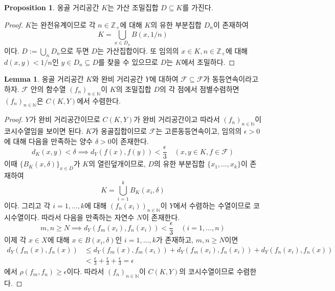 \documentclass[11pt]{book}
\numberwithin{equation}{chapter}
\def\NN{\mathbb{N}}
\def\ZZ{\mathbb{Z}}
\def\eps{\epsilon}
\def\calF{\mathcal{F}}
\theoremstyle{definition}
\newtheorem{lem}[thm]{Lemma}
\newtheorem{prop}[thm]{Proposition}
\begin{document}
\begin{prop} \label{10.2.10}
    옹골 거리공간 \(K\)는 가산 조밀집합 \(D \subseteq K\)를 가진다. 
\end{prop}
\begin{proof}
    \(K\)는 완전유계이므로 각 \(n \in \ZZ_+\)에 대해 \(K\)의 유한 부분집합 \(D_n\)이 존재하여 
    \[
    K = \bigcup_{x \in D_n} B(x, 1/n)    
    \]
    이다. \(D := \bigcup_n D_n\)으로 두면 \(D\)는 가산집합이다. 또 임의의 \(x \in K, n \in \ZZ_+\)에 대해 \(d(x, y) < 1/n\)인 \(y \in D_n \subseteq D\)를 찾을 수 있으므로 \(D\)는 \(K\)에서 조밀하다.
\end{proof}

\begin{lem} \label{10.2.11}
    옹골 거리공간 \(K\)와 완비 거리공간 \(Y\)에 대하여 \(\calF \subseteq \calF\)가 동등연속이라고 하자. \(\calF\) 안의 함수열 \((f_n)_{n \in \NN}\)이 \(K\)의 조밀집합 \(D\)의 각 점에서 점별수렴하면 \((f_n)_{n \in \NN}\)은 \(C(K, Y)\)에서 수렴한다.
\end{lem}
\begin{proof}
    \(Y\)가 완비 거리공간이므로 \(C(K, Y)\)가 완비 거리공간이고 따라서 \((f_n)_{n \in \NN}\)이 코시수열임을 보이면 된다. \(K\)가 옹골집합이므로 \(\calF\)는 고른동등연속이고, 임의의 \(\eps > 0\)에 대해 다음을 만족하는 양수 \(\delta > 0\)이 존재한다.
    \[
    d_K(x, y) < \delta \implies d_Y(f(x), f(y)) < \frac{\eps}{3} \quad (x, y \in K, f \in \calF)    
    \]
    이때 \(\{B_K(x, \delta)\}_{x \in D}\)가 \(K\)의 열린덮개이므로, \(D\)의 유한 부분집합 \(\{x_1, \ldots, x_k\}\)이 존재하여
    \[
    K = \bigcup_{i=1}^k B_K(x_i, \delta)    
    \]
    이다. 그리고 각 \(i = 1, \ldots, k\)에 대해 \((f_n(x_i))_{n \in \NN}\)이 \(Y\)에서 수렴하는 수열이므로 코시수열이다. 따라서 다음을 만족하는 자연수 \(N\)이 존재한다.
    \[
    m, n \ge N \implies d_Y(f_m(x_i), f_n(x_i)) < \frac{\eps}{3} \quad (i = 1, \ldots, n)
    \]
    이제 각 \(x \in X\)에 대해 \(x \in B(x_i, \delta)\)인 \(i = 1, \ldots, k\)가 존재하고, \(m, n \ge N\)이면
    \begin{align*}
        d_Y(f_m(x), f_n(x)) &\le d_Y(f_m(x), f_m(x_i)) + d_Y(f_m(x_i), f_n(x_i)) + d_Y(f_n(x_i), f_n(x))\\
        &< \frac{\eps}{3} + \frac{\eps}{3} + \frac{\eps}{3} = \eps
    \end{align*}
    에서 \(\rho(f_m, f_n) \ge \eps\)이다. 따라서 \((f_n)_{n \in \NN}\)이 \(C(K, Y)\)의 코시수열이므로 수렴한다.
\end{proof}
\end{document}
